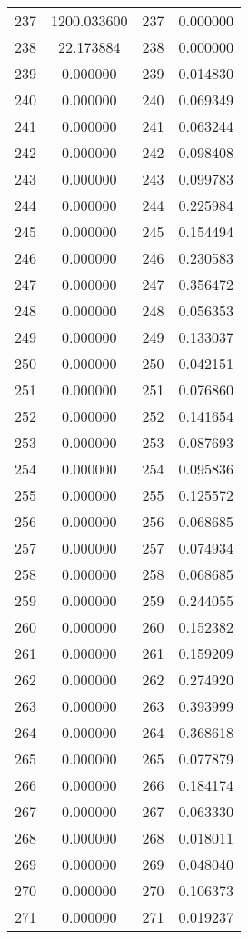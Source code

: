 \documentclass[12pt]{article}
\begin{document}
\begin{longtable}{@{}cccc@{}}
237 & 1200.033600 & 237 & 0.000000 \\
238 & 22.173884 & 238 & 0.000000 \\
239 & 0.000000 & 239 & 0.014830 \\
240 & 0.000000 & 240 & 0.069349 \\
241 & 0.000000 & 241 & 0.063244 \\
242 & 0.000000 & 242 & 0.098408 \\
243 & 0.000000 & 243 & 0.099783 \\
244 & 0.000000 & 244 & 0.225984 \\
245 & 0.000000 & 245 & 0.154494 \\
246 & 0.000000 & 246 & 0.230583 \\
247 & 0.000000 & 247 & 0.356472 \\
248 & 0.000000 & 248 & 0.056353 \\
249 & 0.000000 & 249 & 0.133037 \\
250 & 0.000000 & 250 & 0.042151 \\
251 & 0.000000 & 251 & 0.076860 \\
252 & 0.000000 & 252 & 0.141654 \\
253 & 0.000000 & 253 & 0.087693 \\
254 & 0.000000 & 254 & 0.095836 \\
255 & 0.000000 & 255 & 0.125572 \\
256 & 0.000000 & 256 & 0.068685 \\
257 & 0.000000 & 257 & 0.074934 \\
258 & 0.000000 & 258 & 0.068685 \\
259 & 0.000000 & 259 & 0.244055 \\
260 & 0.000000 & 260 & 0.152382 \\
261 & 0.000000 & 261 & 0.159209 \\
262 & 0.000000 & 262 & 0.274920 \\
263 & 0.000000 & 263 & 0.393999 \\
264 & 0.000000 & 264 & 0.368618 \\
265 & 0.000000 & 265 & 0.077879 \\
266 & 0.000000 & 266 & 0.184174 \\
267 & 0.000000 & 267 & 0.063330 \\
268 & 0.000000 & 268 & 0.018011 \\
269 & 0.000000 & 269 & 0.048040 \\
270 & 0.000000 & 270 & 0.106373 \\
271 & 0.000000 & 271 & 0.019237 \\

\end{longtable}
\end{document}
